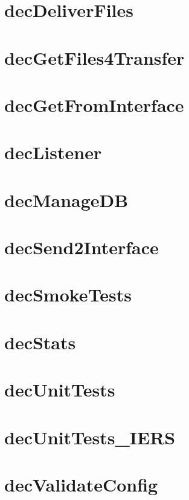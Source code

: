\documentclass[dec_sum_main.tex]{subfiles}
\begin{document}
\section{decDeliverFiles}

\section{decGetFiles4Transfer}

\section{decGetFromInterface}

\section{decListener}

\section{decManageDB}

\section{decSend2Interface}

\section{decSmokeTests}

\section{decStats}

\section{decUnitTests}

\section{decUnitTests\_IERS}

\section{decValidateConfig}
\end{document}
